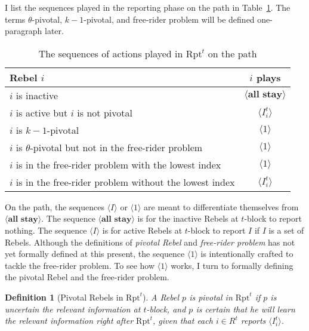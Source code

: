 \documentclass[12pt,letter]{article}
\newcommand{\Omicron}{\mathrm{Rpt}}
\newtheorem{definition}{Definition}[section]
\theoremstyle{definition}
\theoremstyle{remark}
\theoremstyle{claim}
\begin{document}
I list the sequences played in the reporting phase on the path in Table~\ref{Table_msg_RP_path}. The terms $\theta$-pivotal, $k-1$-pivotal, and free-rider problem will be defined one-paragraph later.

\begin{table}[!htbp]
\caption{The sequences of actions played in $\Omicron^t$ on the path}
\label{Table_msg_RP_path}
\begin{center}
\begin{tabular}{l c}
Rebel $i$ & $i$ plays\\
\hline
\hline
$i$ is inactive				& $\langle \textbf{all stay} \rangle$  \\
$i$ is active but $i$ is not pivotal	 					 			& $\langle I^t_i \rangle$  \\
$i$ is $k-1$-pivotal	 					 			& $\langle 1 \rangle$  \\
$i$ is $\theta$-pivotal but not in the free-rider problem	 					 			& $\langle 1 \rangle$  \\
$i$ is in the free-rider problem with the lowest index	 					 			& $\langle 1 \rangle$  \\
$i$ is in the free-rider problem without the lowest index	 					 			& $\langle I^t_i \rangle$  \\
\hline
\end{tabular}
\end{center}
\end{table}

On the path, the sequences $\langle I \rangle$ or $\langle 1 \rangle$ are meant to differentiate themselves from $\langle \textbf{all stay} \rangle$. The sequence $\langle \textbf{all stay} \rangle$ is for the inactive Rebels at $t$-block to report nothing. The sequence $\langle I \rangle$ is for active Rebels at $t$-block to report $I$ if $I$ is a set of Rebels. Although the definitions of \textit{pivotal Rebel} and \textit{free-rider problem} has not yet formally defined at this present, the sequence $\langle 1 \rangle$ is intentionally crafted to tackle the free-rider problem. To see how $\langle 1 \rangle$ works, I turn to formally defining the {pivotal Rebel} and the {free-rider problem}. 

\begin{definition}[Pivotal Rebels in $\Omicron^t$]
A Rebel $p$ is pivotal in $\Omicron^t$ if $p$ is uncertain the relevant information at $t$-block, and $p$ is certain that he will learn the relevant information right after $\Omicron^t$, given that each $i\in R^t$ reports $\langle I^t_i \rangle$.
\end{definition}
\end{document}
